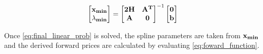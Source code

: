 \documentclass{article}
\begin{document}
\begin{equation}
    \label{eq:final_linear_prob}
    \begin{bmatrix}
        \mathbf{x_{min}} \\
        \mathbf{\lambda_{min}}
    \end{bmatrix} = 
    \begin{bmatrix}
        \mathbf{2H} & \mathbf{A^T} \\
        \mathbf{A} & \mathbf{0}
    \end{bmatrix}^{-1}
    \begin{bmatrix}
        \mathbf{0} \\
        \mathbf{b}
    \end{bmatrix}
\end{equation}

Once \ref{eq:final_linear_prob} is solved, the spline parameters are taken from $\mathbf{x_{min}}$
and the derived forward prices are calculated by evaluating \ref{eq:foward_function}.





\end{document}
